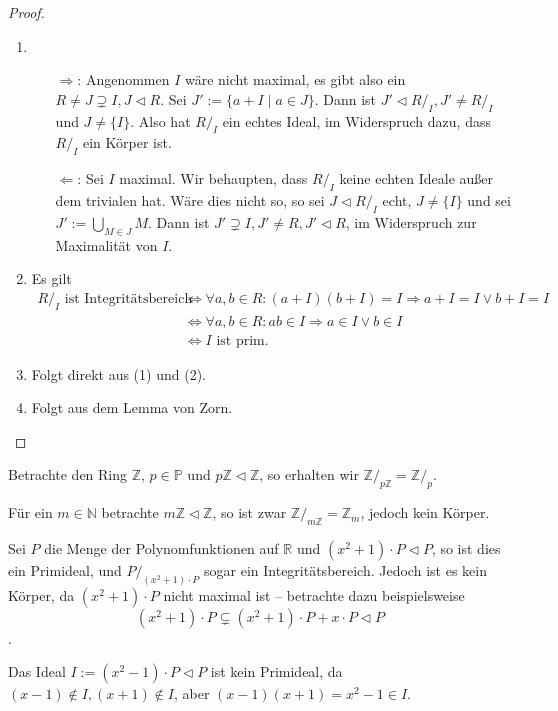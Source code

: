 \begin{proof}{\ }
    \begin{enumerate}
        \item \begin{itemize}
            \item[$\Rightarrow$:] Angenommen $I$ wäre nicht maximal, es gibt also ein $R \neq J \supsetneq I, J \vartriangleleft R$.
            Sei $J' := \{ a + I \mid a \in J \}$. Dann ist $J' \vartriangleleft R/_I, J' \neq R/_I$ und $J \neq \{I\}$. Also hat $R/_I$ ein echtes Ideal, im Widerspruch dazu, dass $R/_I$ ein Körper ist.
            \item[$\Leftarrow$:] Sei $I$ maximal. Wir behaupten, dass $R/_I$ keine echten Ideale außer dem trivialen hat. Wäre dies nicht so, so sei $J \vartriangleleft R/_I$ echt, $J \neq \{I\}$ und sei $J' := \bigcup_{M \in J} M$. Dann ist $J' \supsetneq I, J' \neq R, J' \vartriangleleft R$, im Widerspruch zur Maximalität von $I$.
        \end{itemize}
        \item Es gilt
        \begin{align*}
            R/_I \text{ ist Integritätsbereich} &\Leftrightarrow \forall a, b \in R: (a + I)(b + I) = I \Rightarrow a + I = I \lor b + I = I \\
            &\Leftrightarrow \forall a, b \in R: ab \in I \Rightarrow a \in I \lor b \in I \\
            &\Leftrightarrow I \text{ ist prim}.
        \end{align*}
        \item Folgt direkt aus (1) und (2).
        \item Folgt aus dem Lemma von Zorn.
    \end{enumerate}
\end{proof}


\begin{example}
    Betrachte den Ring $\mathbb{Z}$, $p \in \mathbb{P}$ und $p \mathbb{Z} \vartriangleleft \mathbb{Z}$, so erhalten wir $\mathbb{Z}/_{p\mathbb{Z}} = \mathbb{Z}/_p$.

    Für ein $m \in \mathbb{N}$ betrachte $m \mathbb{Z} \vartriangleleft \mathbb{Z}$, so ist zwar $\mathbb{Z} /_{m\mathbb{Z}} = \mathbb{Z}_m$, jedoch kein Körper.
\end{example}

\begin{example}
    Sei $P$ die Menge der Polynomfunktionen auf $\mathbb{R}$ und $(x^2+1) \cdot P \vartriangleleft P$, so ist dies ein Primideal, und $P/_{(x^2+1) \cdot P}$ sogar ein Integritätsbereich. Jedoch ist es kein Körper, da $(x^2+1) \cdot P$ nicht maximal ist -- betrachte dazu beispielsweise
    $$ (x^2 + 1) \cdot P \subsetneq (x^2+1) \cdot P + x \cdot P \vartriangleleft P $$.

    Das Ideal $I := (x^2 - 1) \cdot P \vartriangleleft P$ ist kein Primideal, da $(x-1)\notin I, (x+1) \notin I$, aber $(x-1)(x+1) = x^2 - 1 \in I$.
\end{example}


